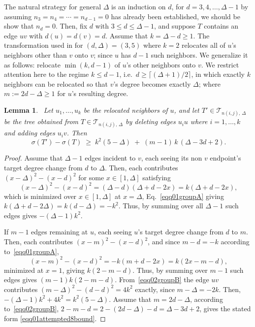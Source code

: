 \documentclass[12pt]{amsart}
\newtheorem{lemma}[theorem]{Lemma}
\newcommand{\TT}{\mathcal{T}}
\begin{document}
The natural strategy for general $\Delta$ is an induction on $d$, for $d=3,4,\dots,\Delta-1$ by assuming $n_3=n_4=\cdots=n_{d-1}=0$ has already been established, we should be show that $n_d=0$. Then, fix $d$ with $3\leqslant d\leqslant \Delta-1$, and suppose $T$ contains an edge $uv$ with $d(u)=d(v)=d$. Assume that $k=\Delta-d\ge1$. The transformation used in \cite[Lemma~8]{DimitrovPaper2025} for $(d,\Delta)=(3,5)$ where $k=2$ relocates all of $u$'s neighbors other than $v$ onto $v$; since $u$ has $d-1$
such neighbors.  We generalize it as follows: relocate $\min(k,d-1)$ of $u$'s other neighbors onto $v$. We restrict attention here to the regime $k\leqslant d-1$, i.e.\ $d\geqslant \lceil(\Delta+1)/2\rceil$, in which exactly $k$ neighbors can be relocated so that $v$'s degree becomes exactly $\Delta$; where $m:=2d-\Delta\geqslant 1$ for $u$'s resulting degree.




\begin{lemma}~\label{lem001attempted8}
Let $u_1,\dots,u_k$ be the relocated neighbors of $u$, and let $T'\in \TT_{n(i,j),\,\Delta}$ be the
tree obtained from $T\in \TT_{n(i,j),\,\Delta}$ by deleting edges $u_iu$ where $i=1,\dots,k$ and adding
edges $u_iv$. Then
\begin{equation}~\label{eqq01attempted8bound}
\sigma(T')-\sigma(T) \;\geqslant\; k^2(5-\Delta) \;+\; (m-1)\,k\,(\Delta-3d+2).
\end{equation}
\end{lemma}

\begin{proof}
Assume that $\Delta-1$ edges incident to $v$, each seeing
its non $v$ endpoint's target degree change from $d$ to $\Delta$. Then,  each contributes $(x-\Delta)^2-(x-d)^2$ for some $x\in[1,\Delta]$ satisfying  
\begin{equation}~\label{eqq01groupA}
(x-\Delta)^2-(x-d)^2 = (\Delta-d)(\Delta+d-2x) = k(\Delta+d-2x),
\end{equation}
which is minimized over $x\in[1,\Delta]$ at $x=\Delta$, Eq.~\eqref{eqq01groupA} giving $k(\Delta+d-2\Delta)=k(d-\Delta)=-k^2$. Thus, by summing  over all
$\Delta-1$ such edges gives $-(\Delta-1)k^2$.

If $m-1$ edges remaining at $u$, each seeing $u$'s target degree
change from $d$ to $m$. Then,  each contributes $(x-m)^2-(x-d)^2$, and  since $m-d=-k$ according to~\eqref{eqq01groupA},
\begin{equation}~\label{eqq02groupB}
(x-m)^2-(x-d)^2 = -k(m+d-2x) = k(2x-m-d),
\end{equation}
minimized at $x=1$, giving $k(2-m-d)$. Thus, by summing over $m-1$ such edges gives $(m-1)k(2-m-d)$.  From~\eqref{eqq02groupB} the edge $uv$ contributes $(m-\Delta)^2-(d-d)^2=4k^2$ exactly, since $m-\Delta=-2k$. Then,  $-(\Delta-1)k^2+4k^2 = k^2(5-\Delta)$. Assume that $m=2d-\Delta$, according to~\eqref{eqq02groupB}, $2-m-d=2-(2d-\Delta)-d=\Delta-3d+2$,
gives the stated form \eqref{eqq01attempted8bound}.
\end{proof}
\end{document}
